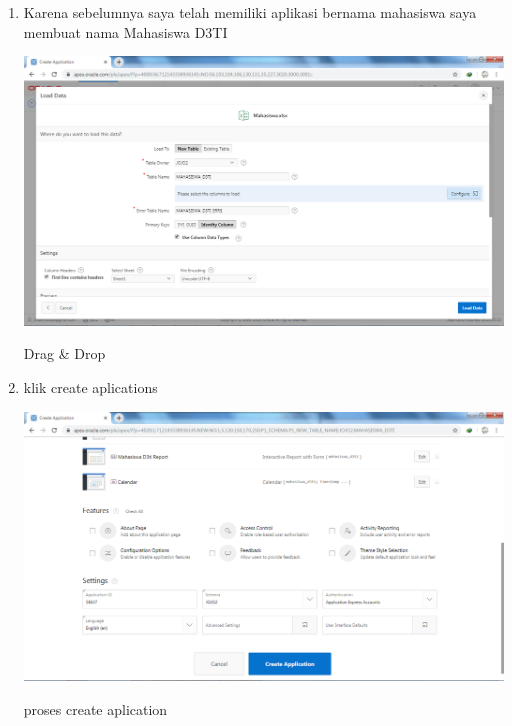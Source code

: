 \documentclass{article}
\begin{document}
\begin{enumerate}
    \item Karena sebelumnya saya telah memiliki aplikasi bernama mahasiswa saya membuat nama Mahasiswa D3TI 
    \begin{center}
         \centering
            \includegraphics[scale=0.27]{figures/DB4.png}
        \caption{Drag & Drop}
        \label{excel}
    \end{center}
    
    \item klik create aplications 
    \begin{center}
         \centering
            \includegraphics[scale=0.27]{figures/DB5.png}
        \caption{proses create aplication}
        \label{excel}
    \end{center}
    

\end{enumerate}
\end{document}
